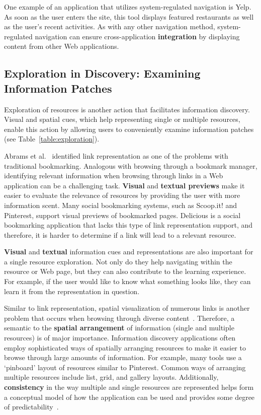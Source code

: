 \documentclass{sigchi}
\begin{document}
{{{{One example of an application that utilizes system-regulated navigation is Yelp. As soon as the user enters the site, this tool displays featured restaurants as well as the user's recent activities. As with any other navigation method, system-regulated navigation can ensure cross-application \textbf{integration} by displaying content from other Web applications. 
} %
} %

{\subsection{Exploration in Discovery: Examining Information Patches}
Exploration of resources is another action that facilitates information discovery. Visual and spatial cues, which help representing single or multiple resources, enable this action by allowing users to conveniently examine information patches (see Table~\ref{table:exploration}). 


Abrams et al.~\cite{abrams1998information} identified link representation as one of the problems with traditional bookmarking. Analogous with browsing through a bookmark manager, identifying relevant information when browsing through links in a Web application can be a challenging task. \textbf{Visual} and \textbf{textual previews} make it easier to evaluate the relevance of resources by providing the user with more information scent. Many social bookmarking systems, such as Scoop.it! and Pinterest, support visual previews of bookmarked pages. Delicious is a social bookmarking application that lacks this type of link representation support, and therefore, it is harder to determine if a link will lead to a relevant resource.

\textbf{Visual} and \textbf{textual} information cues and representations are also important for a single resource exploration. Not only do they help navigating within the resource or Web page, but they can also contribute to the learning experience. For example, if the user would like to know what something looks like, they can learn it from the representation in question.  

Similar to link representation, spatial visualization of numerous links is another problem that occurs when browsing through diverse content~\cite{abrams1998information}. Therefore, a semantic to the \textbf{spatial arrangement} of information (single and multiple resources) is of major importance. Information discovery applications often employ sophisticated ways of spatially arranging resources to make it easier to browse through large amounts of information. For example, many tools use a `pinboard' layout of resources similar to Pinterest. Common ways of arranging multiple resources include list, grid, and gallery layouts. Additionally, \textbf{consistency} in the way multiple and single resources are represented helps form a conceptual model of how the application can be used and provides some degree of predictability~\cite{norman2002design}.

}}}
\end{document}
